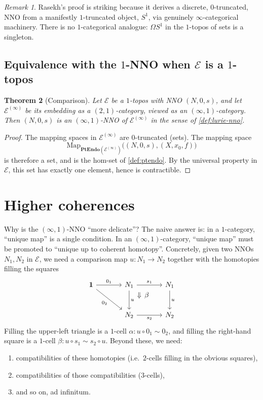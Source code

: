 \documentclass[12pt]{article}
\newtheorem{theorem}{Theorem}[section]
\theoremstyle{definition}
\theoremstyle{remark}
\newtheorem{remark}[theorem]{Remark}
\newcommand{\Map}{\mathrm{Map}}
\newcommand{\PtEndo}{\mathbf{PtEndo}}
\newcommand{\Sone}{S^{1}}
\begin{document}
\begin{remark}
Rasekh's proof is striking because it derives a discrete, $0$-truncated, NNO from a manifestly $1$-truncated object, $\Sone$, via genuinely $\infty$-categorical machinery. There is no $1$-categorical analogue: $\Omega\Sone$ in the $1$-topos of sets is a singleton.
\end{remark}

\subsection{Equivalence with the \texorpdfstring{$1$}{1}-NNO when \texorpdfstring{$\mathcal{E}$}{E} is a \texorpdfstring{$1$}{1}-topos}

\begin{theorem}[Comparison]\label{thm:lurie-nno-equiv}
Let $\mathcal{E}$ be a $1$-topos with NNO $(N,0,s)$, and let $\mathcal{E}^{(\infty)}$ be its embedding as a $(2,1)$-category, viewed as an $(\infty,1)$-category. Then $(N,0,s)$ is an $(\infty,1)$-NNO of $\mathcal{E}^{(\infty)}$ in the sense of \cref{def:lurie-nno}.
\end{theorem}

\begin{proof}
The mapping spaces in $\mathcal{E}^{(\infty)}$ are $0$-truncated (sets). The mapping space
\[
\Map_{\PtEndo(\mathcal{E}^{(\infty)})}\bigl((N,0,s),(X,x_{0},f)\bigr)
\]
is therefore a set, and is the hom-set of \cref{def:ptendo}. By the universal property in $\mathcal{E}$, this set has exactly one element, hence is contractible.
\end{proof}

\section{Higher coherences}\label{sec:higher-coh}

Why is the $(\infty,1)$-NNO ``more delicate''? The naive answer is: in a $1$-category, ``unique map'' is a single condition. In an $(\infty,1)$-category, ``unique map'' must be promoted to ``unique up to coherent homotopy''. Concretely, given two NNOs $N_{1}, N_{2}$ in $\mathcal{E}$, we need a comparison map $u\colon N_{1}\to N_{2}$ together with the homotopies filling the squares
\[
\begin{tikzcd}[column sep=large, row sep=large]
\mathbf{1} \arrow[r, "0_{1}"] \arrow[dr, "0_{2}"'] & N_{1} \arrow[d, "u"] \arrow[r, "s_{1}"] \arrow[dr, phantom, "\Downarrow\,\beta", near start] & N_{1} \arrow[d, "u"] \\
& N_{2} \arrow[r, "s_{2}"'] & N_{2}
\end{tikzcd}
\]
Filling the upper-left triangle is a $1$-cell $\alpha\colon u\circ 0_{1}\sim 0_{2}$, and filling the right-hand square is a $1$-cell $\beta\colon u\circ s_{1}\sim s_{2}\circ u$. Beyond these, we need:
\begin{enumerate}
  \item compatibilities of these homotopies (i.e.\ $2$-cells filling in the obvious squares),
  \item compatibilities of those compatibilities ($3$-cells),
  \item and so on, ad infinitum.
\end{enumerate}
\end{document}
